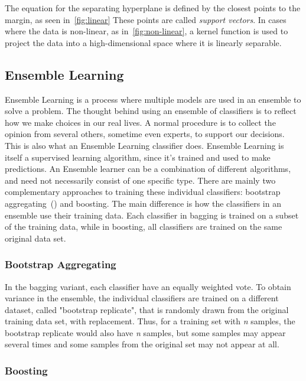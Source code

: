 The equation for the separating hyperplane is defined by the closest points to the margin, as seen in~\autoref{fig:linear} These points are called \emph{support vectors}. In cases where the data is non-linear, as in~\autoref{fig:non-linear}, a kernel function is used to project the data into a high-dimensional space where it is linearly separable.

\subsection{Ensemble Learning}

Ensemble Learning is a process where multiple models are used in an ensemble to solve a problem. The thought behind using an ensemble of classifiers is to reflect how we make choices in our real lives. A normal procedure is to collect the opinion from several others, sometime even experts, to support our decisions. This is also what an Ensemble Learning classifier does. Ensemble Learning is itself a supervised learning algorithm, since it's trained and used to make predictions. An Ensemble learner can be a combination of different algorithms, and need not necessarily consist of one specific type. There are mainly two complementary approaches to training these individual classifiers: bootstrap aggregating~() and boosting. The main difference is how the classifiers in an ensemble use their training data. Each classifier in bagging is trained on a subset of the training data, while in boosting, all classifiers are trained on the same original data set.

\subsubsection{Bootstrap Aggregating}

In the bagging variant, each classifier have an equally weighted vote. To obtain variance in the ensemble, the individual classifiers are trained on a different dataset, called "bootstrap replicate", that is randomly drawn from the original training data set, with replacement. Thus, for a training set with \emph{n} samples, the bootstrap replicate would also have \emph{n} samples, but some samples may appear several times and some samples from the original set may not appear at all.

\subsubsection{Boosting}

